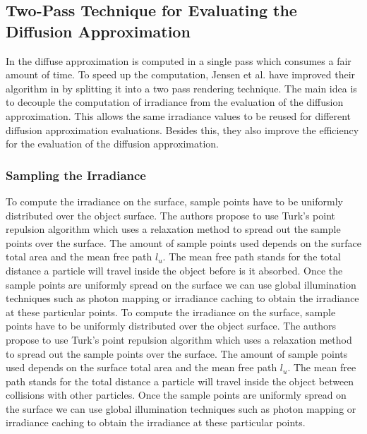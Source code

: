 \documentclass{article}
\begin{document}
\subsection{Two-Pass Technique for Evaluating the Diffusion Approximation}
In \cite{PracticalSSS} the diffuse approximation is computed in a single pass  which consumes a fair amount of time. To speed up the computation, Jensen et al. have improved their algorithm in \cite{HierarchicalSSS} by splitting it into a two pass rendering technique. The main idea is to decouple the computation of irradiance from the evaluation of the diffusion approximation. This allows the same irradiance values to be reused for different diffusion approximation evaluations. Besides this, they also improve the efficiency for the evaluation of the diffusion approximation.

\subsubsection{Sampling the Irradiance}
To compute the irradiance on the surface, sample points have to be uniformly distributed over the object surface. The authors propose to use Turk's point repulsion algorithm which uses a relaxation method to spread out the sample points over the surface. The amount of sample points used depends on the surface total area and the mean free path $l_u$. The mean free path stands for the total distance a particle will travel inside the object before is it absorbed. Once the sample points are uniformly spread on the surface we can use global illumination techniques such as photon mapping or irradiance caching to obtain the irradiance at these particular points.
To compute the irradiance on the surface, sample points have to be uniformly distributed over the object surface. The authors propose to use Turk's point repulsion algorithm \cite{Turk_Point_Repulsion} which uses a relaxation method to spread out the sample points over the surface. The amount of sample points used depends on the surface total area and the mean free path $l_u$. The mean free path stands for the total distance a particle will travel inside the object between collisions with other particles. Once the sample points are uniformly spread on the surface we can use global illumination techniques such as photon mapping or irradiance caching to obtain the irradiance at these particular points.
\end{document}
